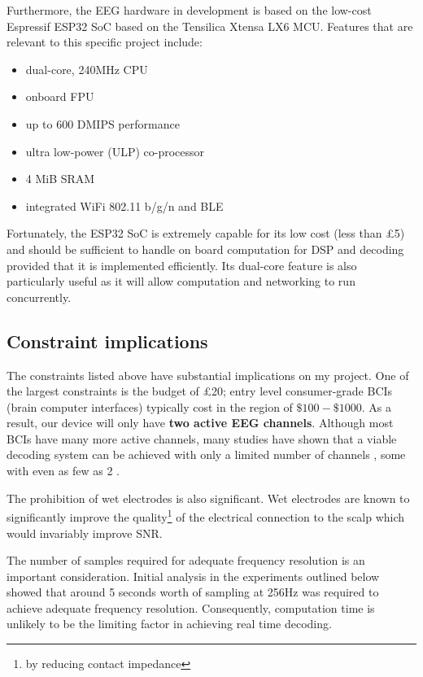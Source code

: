 Furthermore, the EEG hardware in development is based on the low-cost Espressif ESP32 SoC based on the Tensilica Xtensa LX6 MCU. Features that are relevant to this specific project include: 
\begin{itemize}
    \item dual-core, 240MHz CPU
    \item onboard FPU
    \item up to 600 DMIPS performance
    \item ultra low-power (ULP) co-processor
    \item 4 MiB SRAM
    \item integrated WiFi 802.11 b/g/n and BLE
\end{itemize}
Fortunately, the ESP32 SoC is extremely capable for its low cost (less than £5) and should be sufficient to handle on board computation for DSP and decoding provided that it is implemented efficiently. Its dual-core feature is also particularly useful as it will allow computation and networking to run concurrently. 

\subsection{Constraint implications}
The constraints listed above have substantial implications on my project. One of the largest constraints is the budget of £20; entry level consumer-grade BCIs (brain computer interfaces) typically cost in the region of $\$100-\$1000$. As a result, our device will only have \textbf{two active EEG channels}. Although most BCIs have many more active channels, many studies have shown that a viable decoding system can be achieved with only a limited number of channels \cite{Wang2011}, some with even as few as 2 \cite{Acampora2021}. 

The prohibition of wet electrodes is also significant. Wet electrodes are known to significantly improve the quality\footnote{by reducing contact impedance} of the electrical connection to the scalp which would invariably improve SNR. 

The number of samples required for adequate frequency resolution is an important consideration. Initial analysis in the experiments outlined below showed that around 5 seconds worth of sampling at 256Hz was required to achieve adequate frequency resolution. Consequently, computation time is unlikely to be the limiting factor in achieving real time decoding.


